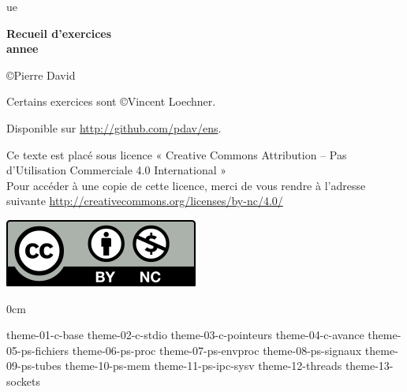 \documentclass  [twoside] {report}
\newcommand {\tassertoc} {{ \setlength {\parskip} {0cm} \tableofcontents }}
\newcommand {\marquerchapitre} [1]
    {
        \addcontentsline {toc} {chapter} {#1}
        \markboth {#1} {#1}
    }
\newcommand {\chapitresanstitre} [1]
    {
        \cleardoublepage
	\marquerchapitre {#1}
    }
\newcommand {\titrechapitre} [1]
    {
	\begin {center}
	    \Large \bf #1
	\end {center}
	\bigskip
	\bigskip
    }
\newcommand {\chapitre} [1]
    {
        \chapitresanstitre {#1}
        \titrechapitre {#1}
    }
\newcounter {td}
\newcounter {tp}
\newcounter {exercice} [tp]
\begin{document}
\thispagestyle {empty}

\begin {titlepage}
     {ue}

    \vfill

    \begin {center}
	\huge\bf
	Recueil d'exercices \\
	\vspace* {5mm}
	 {annee}
    \end {center}

    \vfill

    \begin {center}
	\copyright Pierre David

	Certains exercices sont \copyright Vincent Loechner.

	Disponible sur \url {http://github.com/pdav/ens}.

        Ce texte est placé sous licence « Creative Commons Attribution
	-- Pas d’Utilisation Commerciale 4.0 International » \\
        Pour accéder à une copie de cette licence,
        merci de vous rendre à l'adresse suivante
        \url {http://creativecommons.org/licenses/by-nc/4.0/}

        \includegraphics [scale=.5] {by-nc}
    \end {center}
\end {titlepage}

\cleardoublepage
\tassertoc


% 
% 
% 
% 
% 
% 
% 


 {theme-01-c-base}
 {theme-02-c-stdio}
 {theme-03-c-pointeurs}
 {theme-04-c-avance}
 {theme-05-ps-fichiers}
 {theme-06-ps-proc}
 {theme-07-ps-envproc}
 {theme-08-ps-signaux}
 {theme-09-ps-tubes}
 {theme-10-ps-mem}
 {theme-11-ps-ipc-sysv}
 {theme-12-threads}
 {theme-13-sockets}
\end{document}
